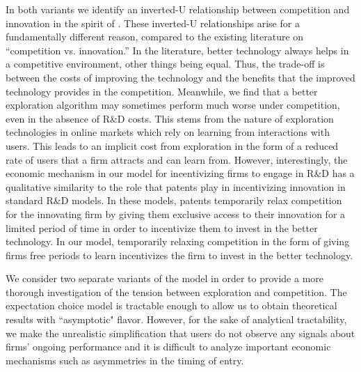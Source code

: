 {In both variants we identify an inverted-U relationship between competition and innovation in the spirit of . These inverted-U relationships arise for a fundamentally different reason, compared to the existing literature on ``competition vs. innovation.'' In the literature, better technology always helps in a competitive environment, other things being equal. Thus, the trade-off is between the costs of improving the technology and the benefits that the improved technology provides in the competition. Meanwhile, we find that a better exploration algorithm may sometimes perform much worse under competition, even in the absence of R\&D costs. This stems from the nature of exploration technologies in online markets which rely on learning from interactions with users. This leads to an implicit cost from exploration in the form of a reduced rate of users that a firm attracts and can learn from. However, interestingly, the economic mechanism in our model for incentivizing firms to engage in R\&D has a qualitative similarity to the role that patents play in incentivizing innovation in standard R\&D models. In these models, patents temporarily relax competition for the innovating firm by giving them exclusive access to their innovation for a limited period of time in order to incentivize them to invest in the better technology. In our model, temporarily relaxing competition in the form of giving firms free periods to learn incentivizes the firm to invest in the better technology.

We consider two separate variants of the model in order to provide a more thorough investigation of the tension between exploration and competition. The expectation choice model is tractable enough to allow us to obtain theoretical results with ``asymptotic" flavor. However, for the sake of analytical tractability, we make the unrealistic simplification that users do not observe any signals about firms' ongoing performance and it is difficult to analyze important economic mechanisms such as asymmetries in the timing of entry.

}
